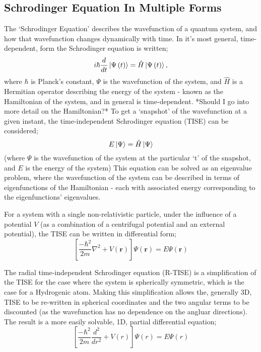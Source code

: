 \subsection{Schrodinger Equation In Multiple Forms}
The `Schrodinger Equation' describes the wavefunction of a quantum system, and how that wavefunction changes dynamically with time\cite{CT}. In it's most general, time-dependent, form the Schrodinger equation is written;
$$
i\hbar \frac{d}{dt}\ket{\Psi\left(t\right)} = \hat{H}\ket{\Psi\left(t\right)},
$$
where $\hbar$ is Planck's constant, $\Psi$ is the wavefunction of the system, and $\hat{H}$ is a Hermitian operator describing the energy of the system - known as the Hamiltonian of the system, and in general is time-dependent.\newline
*Should I go into more detail on the Hamiltonian?*
\newline
To get a `snapshot' of the wavefunction at a given instant, the time-independent Schrodinger equation (TISE) can be considered;
$$
E\ket{\Psi} = \hat{H}\ket{\Psi} 
$$
(where $\Psi$ is the wavefunction of the system at the particular `t' of the snapshot, and $E$ is the energy of the system)\newline
This equation can be solved as an eigenvalue problem, where the wavefunction of the system can be described in terms of eigenfunctions of the Hamiltonian - each with associated energy corresponding to the eigenfunctions' eigenvalues.\newline

For a system with a single non-relativistic particle, under the influence of a potential $V$ (as a combination of a centrifugal potential and an external potential), the TISE can be written in differential form;
$$
\left[\frac{-\hbar^{2}}{2m}\nabla^{2} + V\left(\mathbf{r}\right)\right] \Psi\left(\mathbf{r}\right) = E\Psi\left(\mathbf{r}\right)
$$

The radial time-independent Schrodinger equation (R-TISE) is a simplification of the TISE for the case where the system is spherically symmetric, which is the case for a Hydrogenic atom.%
Making this simplification allows the, generally 3D, TISE to be re-written in spherical coordinates and the two angular terms to be discounted (as the wavefunction has no dependence on the angluar directions). The result is a more easily solvable, 1D, partial differential equation;
$$
\left[\frac{-\hbar^{2}}{2m}\frac{d^2}{dr^2} + V\left(r\right)\right] \Psi\left(r\right) = E\Psi\left(r\right)
$$

